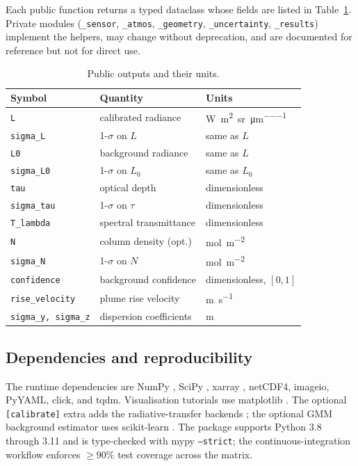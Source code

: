 \documentclass[11pt, a4paper]{article}
\begin{document}
Each public function returns a typed dataclass whose fields are listed
in Table~\ref{tab:outputs}. Private modules (\texttt{\_sensor},
\texttt{\_atmos}, \texttt{\_geometry}, \texttt{\_uncertainty},
\texttt{\_results}) implement the helpers, may change without
deprecation, and are documented for reference but not for direct use.

\begin{table}[!t]
  \centering
  \caption{Public outputs and their units.}
  \label{tab:outputs}
  \small
  \begin{tabular}{@{}lll@{}}
    \toprule
    Symbol & Quantity & Units \\
    \midrule
    \texttt{L}             & calibrated radiance        & \si{\watt\per\square\metre\per\steradian\per\micro\metre} \\
    \texttt{sigma\_L}      & 1-$\sigma$ on $L$          & same as $L$ \\
    \texttt{L0}            & background radiance        & same as $L$ \\
    \texttt{sigma\_L0}     & 1-$\sigma$ on $L_0$        & same as $L_0$ \\
    \texttt{tau}           & optical depth              & dimensionless \\
    \texttt{sigma\_tau}    & 1-$\sigma$ on $\tau$       & dimensionless \\
    \texttt{T\_lambda}     & spectral transmittance     & dimensionless \\
    \texttt{N}             & column density (opt.)      & \si{\mole\per\square\metre} \\
    \texttt{sigma\_N}      & 1-$\sigma$ on $N$          & \si{\mole\per\square\metre} \\
    \texttt{confidence}    & background confidence      & dimensionless, $[0,1]$ \\
    \texttt{rise\_velocity}      & plume rise velocity       & \si{\metre\per\second} \\
    \texttt{sigma\_y, sigma\_z}  & dispersion coefficients   & \si{\metre} \\
    \bottomrule
  \end{tabular}
\end{table}

\subsection{Dependencies and reproducibility}

The runtime dependencies are NumPy \cite{harris2020array},
SciPy \cite{virtanen2020scipy}, xarray \cite{hoyer2017xarray},
netCDF4, imageio, PyYAML, click, and tqdm. Visualisation tutorials use
matplotlib \cite{hunter2007matplotlib}. The optional
\texttt{[calibrate]} extra adds the radiative-transfer backends
\cite{vermote1997second, berk2014modtran}; the optional GMM background
estimator uses scikit-learn \cite{pedregosa2011scikit}. The package
supports Python 3.8 through 3.11 and is type-checked with mypy
\texttt{--strict}; the continuous-integration workflow enforces
$\geq 90\%$ test coverage across the matrix.
\end{document}
